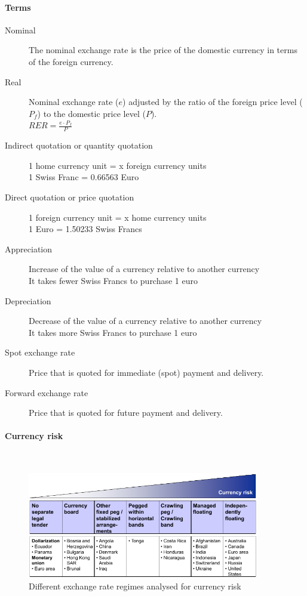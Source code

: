 \paragraph{Terms}
\begin{description}
	\item[Nominal] The nominal exchange rate is the price of the domestic currency in terms of the foreign currency.
	\item[Real] Nominal exchange rate ($e$) adjusted by the ratio of the foreign price level ($P_f$) to the domestic price level ($P$).\\
	$RER = \frac{e\cdot P_f}{P}$
	\item[Indirect quotation or quantity quotation] 1 home currency unit = x foreign currency units\\
	1 Swiss Franc = 0.66563 Euro
	\item[Direct quotation or price quotation] 1 foreign currency unit = x home currency units\\
	1 Euro = 1.50233 Swiss Francs
	\item[Appreciation] Increase of the value of a currency relative to another currency\\
	It takes fewer Swiss Francs to purchase 1 euro
	\item[Depreciation] Decrease of the value of a currency relative to another currency\\
	It takes more Swiss Francs to purchase 1 euro
	\item[Spot exchange rate] Price that is quoted for immediate (spot) payment and delivery.
	\item[Forward exchange rate] Price that is quoted for future payment and delivery.
\end{description}


\paragraph{Currency risk}\mbox{}\\
\begin{figure}[H]
	\centering
	\includegraphics[width=0.9\textwidth]{figures/exchangeRegimes.png}
	\caption{Different exchange rate regimes analysed for currency risk}
\end{figure}

